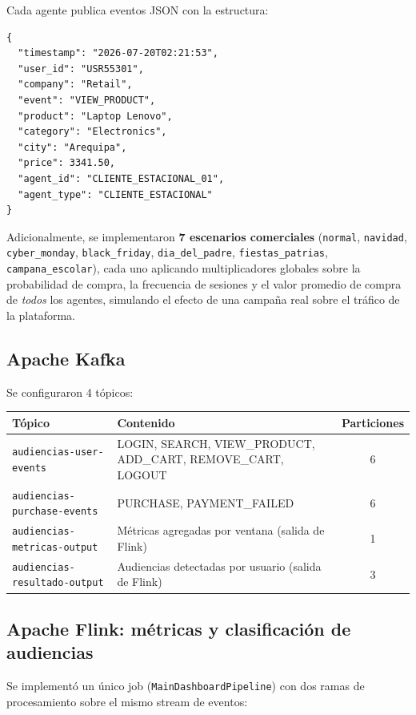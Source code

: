\documentclass[11pt,a4paper]{article}
\begin{document}
Cada agente publica eventos JSON con la estructura:
\begin{lstlisting}
{
  "timestamp": "2026-07-20T02:21:53",
  "user_id": "USR55301",
  "company": "Retail",
  "event": "VIEW_PRODUCT",
  "product": "Laptop Lenovo",
  "category": "Electronics",
  "city": "Arequipa",
  "price": 3341.50,
  "agent_id": "CLIENTE_ESTACIONAL_01",
  "agent_type": "CLIENTE_ESTACIONAL"
}
\end{lstlisting}

Adicionalmente, se implementaron \textbf{7 escenarios comerciales}
(\texttt{normal}, \texttt{navidad}, \texttt{cyber\_monday},
\texttt{black\_friday}, \texttt{dia\_del\_padre},
\texttt{fiestas\_patrias}, \texttt{campana\_escolar}), cada uno aplicando
multiplicadores globales sobre la probabilidad de compra, la frecuencia
de sesiones y el valor promedio de compra de \emph{todos} los agentes,
simulando el efecto de una campaña real sobre el tráfico de la
plataforma.

\subsection{Apache Kafka}

Se configuraron 4 tópicos:

\begin{center}
\begin{tabular}{@{}llc@{}}
\toprule
\textbf{Tópico} & \textbf{Contenido} & \textbf{Particiones} \\
\midrule
\texttt{audiencias-user-events} & LOGIN, SEARCH, VIEW\_PRODUCT, ADD\_CART, REMOVE\_CART, LOGOUT & 6 \\
\texttt{audiencias-purchase-events} & PURCHASE, PAYMENT\_FAILED & 6 \\
\texttt{audiencias-metricas-output} & Métricas agregadas por ventana (salida de Flink) & 1 \\
\texttt{audiencias-resultado-output} & Audiencias detectadas por usuario (salida de Flink) & 3 \\
\bottomrule
\end{tabular}
\end{center}

\subsection{Apache Flink: métricas y clasificación de audiencias}

Se implementó un único job (\texttt{MainDashboardPipeline}) con dos
ramas de procesamiento sobre el mismo stream de eventos:
\end{document}
